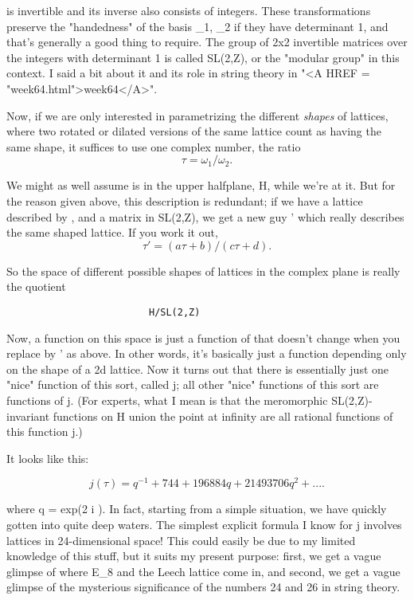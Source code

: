 is invertible and its inverse also consists of integers.
These transformations preserve the "handedness" of the
basis \omega _{1}, \omega _{2} 
if they have determinant 1, and that's generally
a good thing to require.  The group of 2x2 invertible matrices over the
integers with determinant 1 is called SL(2,Z), or the "modular group" in
this context.  I said a bit about it and its role in string theory in
"<A HREF = "week64.html">week64</A>".

Now, if we are only interested in parametrizing the different \emph{shapes}
of lattices, where two rotated or dilated versions of the same lattice
count as having the same shape, it suffices to use one complex number, the
ratio 
$$
                       \tau  = \omega _{1}/\omega _{2}.
$$
    
We might as well assume \tau  is in the upper 
halfplane, H, while we're at it.    But for the reason given above, this 
description is redundant; if we have a lattice described by \tau , and a 
matrix in SL(2,Z), we get a new guy \tau ' which really describes the 
same shaped lattice.  If you work it out, 
$$
                   \tau ' = (a \tau  + b)/(c \tau  + d).
$$
    
So the space of different possible shapes of lattices in the complex
plane is really the quotient 

\begin{verbatim}
                         H/SL(2,Z)
\end{verbatim}
    

Now, a function on this space is just a function of \tau  that doesn't
change when you replace \tau  by \tau ' as above.  In other words, it's
basically just a function depending only on the shape of a 2d lattice.
Now it turns out that there is essentially just one "nice" function of
this sort, called j; all other "nice" functions of this sort are
functions of j.  (For experts, what I mean is that the meromorphic
SL(2,Z)-invariant functions on H union the point at infinity are all
rational functions of this function j.)

It looks like this:

$$
           j(\tau ) = q^{-1} + 744 + 196884 q + 21493706 q^{2} + ....
$$
    

where q = exp(2 \pi  i \tau ).  In fact, starting from a simple situation,
we have quickly gotten into quite deep waters.  The simplest explicit
formula I know for j involves lattices in 24-dimensional space!  This
could easily be due to my limited knowledge of this stuff, but it suits
my present purpose: first, we get a vague glimpse of where E_8 and the
Leech lattice come in, and second, we get a vague glimpse of the
mysterious significance of the numbers 24 and 26 in string theory.

